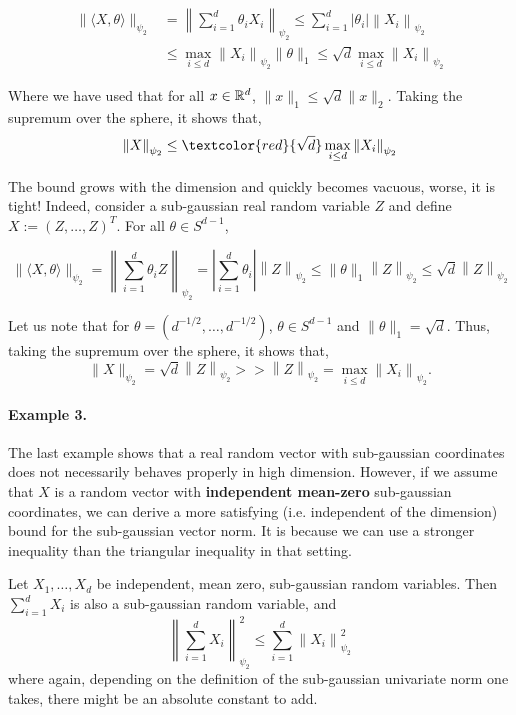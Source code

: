 \documentclass{article}
\begin{document}
\begin{equation*}
  \begin{aligned}
    \|\langle X, \theta\rangle\|_{\psi_{2}} &=\left\|\sum_{i=1}^{d} \theta_{i} X_{i}\right\|_{\psi_{2}} \leq \sum_{i=1}^{d} |\theta_{i}|\left\|X_{i}\right\|_{\psi_{2}}\\
    & \leq \max_{i \leq d}\left\|X_{i}\right\|_{\psi_{2}} \|\theta\|_1 \leq \sqrt{d}  \max_{i \leq d}\left\|X_{i}\right\|_{\psi_{2}}
  \end{aligned}
\end{equation*}

Where we have used that for all $x \in \mathbb{R}^{d}$, $\|x\|_1 \leq \sqrt{d}\|x\|_2$. Taking the supremum over the sphere, it shows that, $$\left\|X\right\|_{\psi_{2}} \leq \textcolor{red}{\sqrt{d}}  \max_{i \leq d}\left\|X_{i}\right\|_{\psi_{2}}$$

The bound grows with the dimension and quickly becomes vacuous, worse, it
is tight! Indeed, consider a sub-gaussian real random variable $Z$ and define $X:=
(Z,\ldots,Z)^T$. For all $\theta \in S^{d-1}$,

\begin{equation*}
  \|\langle X, \theta\rangle\|_{\psi_{2}} =\left\|\sum_{i=1}^{d} \theta_{i} Z\right\|_{\psi_{2}} = \left| \sum_{i=1}^d \theta_i \right|\left\|Z\right\|_{\psi_{2}} \leq \|\theta\|_1\left\|Z\right\|_{\psi_{2}} \leq \sqrt{d} \left\|Z\right\|_{\psi_{2}}
\end{equation*}

Let us note that for $\theta = (d^{-1/2}, \ldots, d^{-1/2})$,
$\theta \in S^{d-1}$ and $\|\theta\|_1 = \sqrt{d}$. Thus, taking the supremum over the
sphere, it shows that, $$\| X\|_{\psi_{2}} = \sqrt{d}\left\|Z\right\|_{\psi_{2}}
>> \left\|Z\right\|_{\psi_{2}} = \max_{i \leq d}\left\|X_{i}\right\|_{\psi_{2}}.$$

\paragraph{Example 3.} The last example shows that a real random vector with
sub-gaussian coordinates does not necessarily behaves properly in high
dimension. However, if we assume that $X$ is a random vector with \textbf{independent mean-zero}
sub-gaussian coordinates, we can derive a more satisfying (i.e. independent
of the dimension) bound for the sub-gaussian vector norm. It is because we can
use a stronger inequality than the triangular inequality in that setting.

\begin{prop} Let
  $X_{1}, \ldots, X_{d}$ be independent, mean zero, sub-gaussian random variables. Then $\sum_{i=1}^{d} X_{i}$ is also a sub-gaussian random variable, and
  $$
  \left\|\sum_{i=1}^{d} X_{i}\right\|_{\psi_{2}}^{2} \leq \sum_{i=1}^{d}\left\|X_{i}\right\|_{\psi_{2}}^{2}
  $$
  where again, depending on the definition of the sub-gaussian
  univariate norm one takes, there might be an absolute constant to add.
\end{prop}
\end{document}
